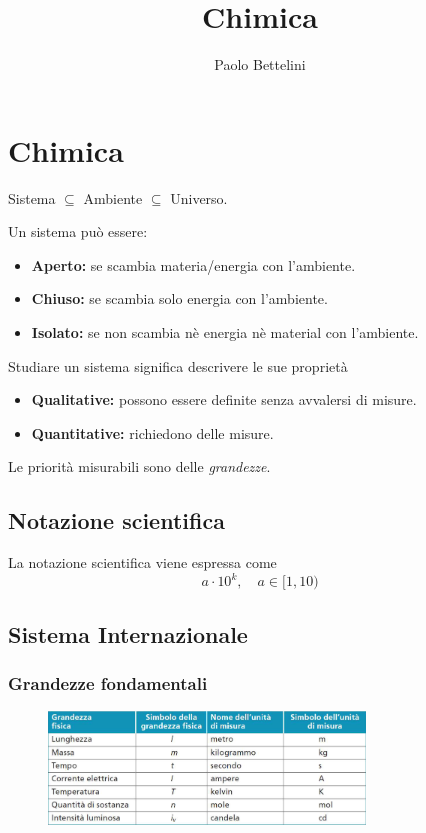 \documentclass[a4paper]{article}
\title{Chimica}
\author{Paolo Bettelini}
\date{}
\begin{document}
\maketitle
\tableofcontents


\pagebreak

\section{Chimica}

Sistema \(\subseteq\) Ambiente \(\subseteq\) Universo.

Un sistema può essere:
\begin{itemize}
    \item \textbf{Aperto:} se scambia materia/energia con l'ambiente.
    \item \textbf{Chiuso:} se scambia solo energia con l'ambiente.
    \item \textbf{Isolato:} se non scambia nè energia nè material con l'ambiente.
\end{itemize}

Studiare un sistema significa descrivere le sue proprietà
\begin{itemize}
    \item \textbf{Qualitative:} possono essere definite senza avvalersi
    di misure.
    \item \textbf{Quantitative:} richiedono delle misure.
\end{itemize}
Le priorità misurabili sono delle \textit{grandezze}.


\subsection{Notazione scientifica}

La notazione scientifica viene espressa come
\[
    a \cdot 10^k,\quad a\in [1, 10)
\]

\subsection{Sistema Internazionale}

\subsubsection{Grandezze fondamentali}

\begin{figure}[h]
    \centering
    \includegraphics[width=0.75\textwidth]{./si.png}
\end{figure}
\end{document}
